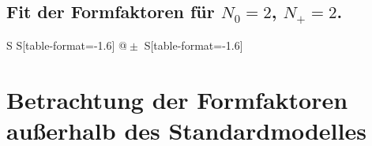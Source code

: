 \subsection{Fit der Formfaktoren für \texorpdfstring{$N_0 = \num{2}$, $N_+ = \num{2}$}{N0 = 2, N+ = 2}.}

\begin{table}
    \centering
    \caption{Messdaten Modenbestimmung.}
    \label{tab:moden}
    \begin{tabular}{
  S
	S[table-format=-1.6]
	@{${}\pm{}$}
	S[table-format=-1.6]
	}
	\toprule
			\\
	\midrule
  \rule{0pt}{2ex}
   
  \rule{0pt}{2ex}
   
  \rule{0pt}{2ex}
   
  \rule{0pt}{2ex}
   
  \rule{0pt}{2ex}
   
  \rule{0pt}{2ex}
   

    \bottomrule
    \end{tabular}
    \end{table}


\section{Betrachtung der Formfaktoren außerhalb des Standardmodelles}
